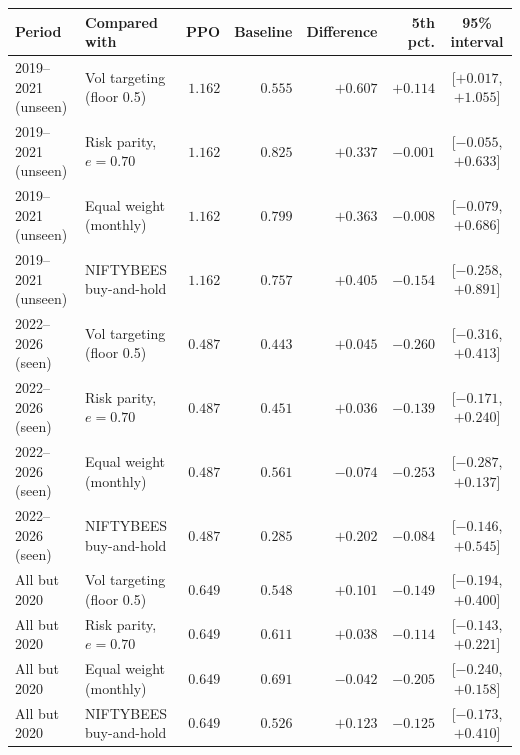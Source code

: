 \begin{tabular}{llrrrrc}
\toprule
Period & Compared with & PPO & Baseline & Difference & 5th pct. & 95\% interval \\
\midrule
2019--2021 (unseen) & Vol targeting (floor 0.5) & $1.162$ & $0.555$ & $+0.607$ & $+0.114$ & [$+0.017$, $+1.055$] \\
2019--2021 (unseen) & Risk parity, $e=0.70$ & $1.162$ & $0.825$ & $+0.337$ & $-0.001$ & [$-0.055$, $+0.633$] \\
2019--2021 (unseen) & Equal weight (monthly) & $1.162$ & $0.799$ & $+0.363$ & $-0.008$ & [$-0.079$, $+0.686$] \\
2019--2021 (unseen) & NIFTYBEES buy-and-hold & $1.162$ & $0.757$ & $+0.405$ & $-0.154$ & [$-0.258$, $+0.891$] \\
2022--2026 (seen) & Vol targeting (floor 0.5) & $0.487$ & $0.443$ & $+0.045$ & $-0.260$ & [$-0.316$, $+0.413$] \\
2022--2026 (seen) & Risk parity, $e=0.70$ & $0.487$ & $0.451$ & $+0.036$ & $-0.139$ & [$-0.171$, $+0.240$] \\
2022--2026 (seen) & Equal weight (monthly) & $0.487$ & $0.561$ & $-0.074$ & $-0.253$ & [$-0.287$, $+0.137$] \\
2022--2026 (seen) & NIFTYBEES buy-and-hold & $0.487$ & $0.285$ & $+0.202$ & $-0.084$ & [$-0.146$, $+0.545$] \\
All but 2020 & Vol targeting (floor 0.5) & $0.649$ & $0.548$ & $+0.101$ & $-0.149$ & [$-0.194$, $+0.400$] \\
All but 2020 & Risk parity, $e=0.70$ & $0.649$ & $0.611$ & $+0.038$ & $-0.114$ & [$-0.143$, $+0.221$] \\
All but 2020 & Equal weight (monthly) & $0.649$ & $0.691$ & $-0.042$ & $-0.205$ & [$-0.240$, $+0.158$] \\
All but 2020 & NIFTYBEES buy-and-hold & $0.649$ & $0.526$ & $+0.123$ & $-0.125$ & [$-0.173$, $+0.410$] \\
\bottomrule
\end{tabular}
